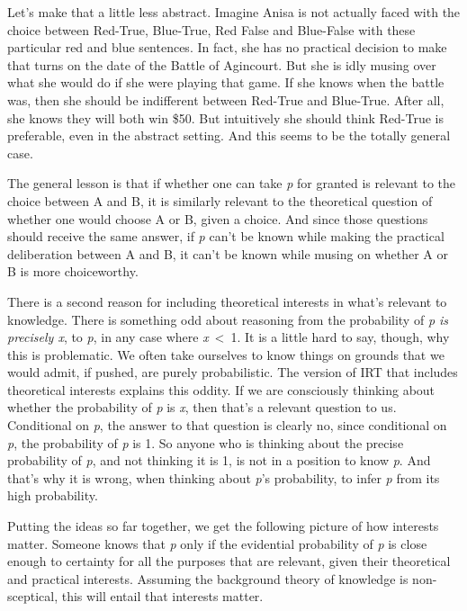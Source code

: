 \documentclass[
  11pt,
]{book}
\begin{document}
Let's make that a little less abstract. Imagine Anisa is not actually faced with the choice between Red-True, Blue-True, Red False and Blue-False with these particular red and blue sentences. In fact, she has no practical decision to make that turns on the date of the Battle of Agincourt. But she is idly musing over what she would do if she were playing that game. If she knows when the battle was, then she should be indifferent between Red-True and Blue-True. After all, she knows they will both win \$50. But intuitively she should think Red-True is preferable, even in the abstract setting. And this seems to be the totally general case.

The general lesson is that if whether one can take \emph{p} for granted is relevant to the choice between A and B, it is similarly relevant to the theoretical question of whether one would choose A or B, given a choice. And since those questions should receive the same answer, if \emph{p} can't be known while making the practical deliberation between A and B, it can't be known while musing on whether A or B is more choiceworthy.

There is a second reason for including theoretical interests in what's relevant to knowledge. There is something odd about reasoning from the probability of \emph{p is precisely x}, to \emph{p}, in any case where \emph{x}~\textless~1. It is a little hard to say, though, why this is problematic. We often take ourselves to know things on grounds that we would admit, if pushed, are purely probabilistic. The version of IRT that includes theoretical interests explains this oddity. If we are consciously thinking about whether the probability of \emph{p} is \emph{x}, then that's a relevant question to us. Conditional on \emph{p}, the answer to that question is clearly no, since conditional on \emph{p}, the probability of \emph{p} is 1. So anyone who is thinking about the precise probability of \emph{p}, and not thinking it is 1, is not in a position to know \emph{p}. And that's why it is wrong, when thinking about \emph{p}'s probability, to infer \emph{p} from its high probability.

Putting the ideas so far together, we get the following picture of how interests matter. Someone knows that \emph{p} only if the evidential probability of \emph{p} is close enough to certainty for all the purposes that are relevant, given their theoretical and practical interests. Assuming the background theory of knowledge is non-sceptical, this will entail that interests matter.
\end{document}
